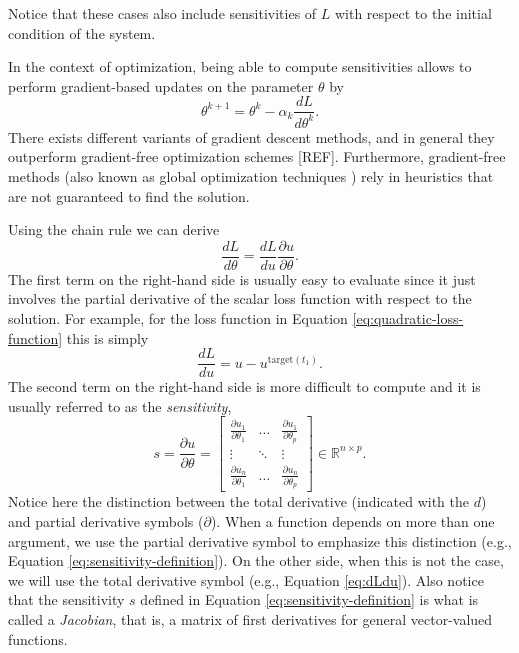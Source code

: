 Notice that these cases also include sensitivities of $L$ with respect to the initial condition of the system.


In the context of optimization, being able to compute sensitivities allows to perform gradient-based updates on the parameter $\theta$ by 
\begin{equation}
    \theta^{k+1} 
    = 
    \theta^k 
    - 
    \alpha_k 
    \frac{dL}{d\theta^k}.
\end{equation}
There exists different variants of gradient descent methods\cite{ruder2016overview-gradient-descent}, and in general they outperform gradient-free optimization schemes [REF].
Furthermore, gradient-free methods (also known as global optimization techniques ) rely in heuristics\cite{Pearl-heuristics} that are not guaranteed to find the solution. 

Using the chain rule we can derive
\begin{equation} 
 \frac{dL}{d\theta} = \frac{dL}{du} \frac{\partial u}{\partial \theta}.
 \label{eq:dLdtheta_VJP}
\end{equation} 
The first term on the right-hand side is usually easy to evaluate since it just involves the partial derivative of the scalar loss function with respect to the solution.
For example, for the loss function in Equation \eqref{eq:quadratic-loss-function} this is simply
\begin{equation}
    \frac{dL}{du} = u - u^{\text{target}(t_1)}.
    \label{eq:dLdu}
\end{equation}
The second term on the right-hand side is more difficult to compute and it is usually referred to as the \textit{sensitivity},
\begin{equation}
 s 
 = 
 \frac{\partial u}{\partial \theta} 
 =
 \begin{bmatrix}
   \frac{\partial u_1}{\partial \theta_1} & \dots & \frac{\partial u_1}{\partial \theta_p} \\
   \vdots & \ddots & \vdots \\
   \frac{\partial u_n}{\partial \theta_1} & \dots & \frac{\partial u_n}{\partial \theta_p}
 \end{bmatrix}
 \in \mathbb R^{n \times p}.
 \label{eq:sensitivity-definition}
\end{equation}
Notice here the distinction between the total derivative (indicated with the $d$) and partial derivative symbols ($\partial$). 
When a function depends on more than one argument, we use the partial derivative symbol to emphasize this distinction (e.g., Equation \eqref{eq:sensitivity-definition}). 
On the other side, when this is not the case, we will use the total derivative symbol (e.g., Equation \eqref{eq:dLdu}).
Also notice that the sensitivity $s$ defined in Equation \eqref{eq:sensitivity-definition} is what is called a \textit{Jacobian}, that is, a matrix of first derivatives for general vector-valued functions.

